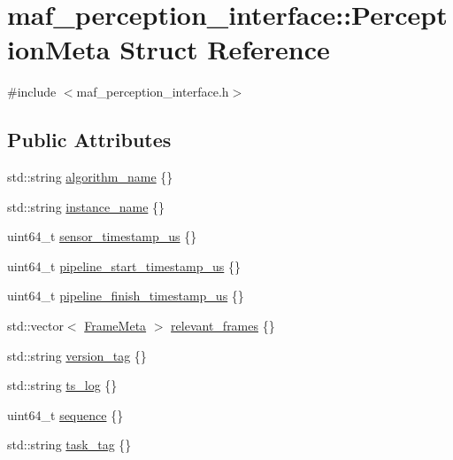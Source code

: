 \hypertarget{structmaf__perception__interface_1_1PerceptionMeta}{}\section{maf\+\_\+perception\+\_\+interface\+:\+:Perception\+Meta Struct Reference}
\label{structmaf__perception__interface_1_1PerceptionMeta}


{\ttfamily \#include $<$maf\+\_\+perception\+\_\+interface.\+h$>$}

\subsection*{Public Attributes}
\begin{DoxyCompactItemize}
\item 
std\+::string \hyperlink{structmaf__perception__interface_1_1PerceptionMeta_aade5caafcb8518a7fbe336eff564e89e}{algorithm\+\_\+name} \{\}
\item 
std\+::string \hyperlink{structmaf__perception__interface_1_1PerceptionMeta_a9a35311c4d133facf207e93cd3c3ec5e}{instance\+\_\+name} \{\}
\item 
uint64\+\_\+t \hyperlink{structmaf__perception__interface_1_1PerceptionMeta_ad6356e674a6b622adf4a01f6e13d8c68}{sensor\+\_\+timestamp\+\_\+us} \{\}
\item 
uint64\+\_\+t \hyperlink{structmaf__perception__interface_1_1PerceptionMeta_ab68bc79922efaeb1fc469a967150f50d}{pipeline\+\_\+start\+\_\+timestamp\+\_\+us} \{\}
\item 
uint64\+\_\+t \hyperlink{structmaf__perception__interface_1_1PerceptionMeta_a527891ebc65c8fd79b43105ad0a5d7ae}{pipeline\+\_\+finish\+\_\+timestamp\+\_\+us} \{\}
\item 
std\+::vector$<$ \hyperlink{structmaf__perception__interface_1_1FrameMeta}{Frame\+Meta} $>$ \hyperlink{structmaf__perception__interface_1_1PerceptionMeta_a7ebda1750fbd04777e889bf6157db986}{relevant\+\_\+frames} \{\}
\item 
std\+::string \hyperlink{structmaf__perception__interface_1_1PerceptionMeta_aa1923527aed156e61c4367650cd67016}{version\+\_\+tag} \{\}
\item 
std\+::string \hyperlink{structmaf__perception__interface_1_1PerceptionMeta_ad55472d7e6950540391b292ee5a028ad}{ts\+\_\+log} \{\}
\item 
uint64\+\_\+t \hyperlink{structmaf__perception__interface_1_1PerceptionMeta_aacef39c2672bd17311474c2a0b67b08f}{sequence} \{\}
\item 
std\+::string \hyperlink{structmaf__perception__interface_1_1PerceptionMeta_a4aca7db3caba3c6e15c32979c0d05132}{task\+\_\+tag} \{\}
\end{DoxyCompactItemize}


